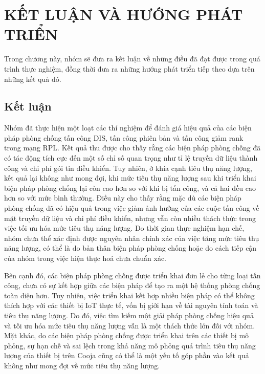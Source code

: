 \section{KẾT LUẬN VÀ HƯỚNG PHÁT TRIỂN}
\label{sec:ch6}

Trong chương này, nhóm sẽ đưa ra kết luận về những điều đã đạt được trong quá trình thực nghiệm, đồng thời đưa ra những hướng phát triển tiếp theo dựa trên những kết quả đó.

\subsection{Kết luận}
Nhóm đã thực hiện một loạt các thí nghiệm để đánh giá hiệu quả của các biện pháp phòng chống tấn công DIS, tấn công phiên bản và tấn công giảm rank trong mạng RPL. Kết quả thu được cho thấy rằng các biện pháp phòng chống đã có tác động tích cực đến một số chỉ số quan trọng như tỉ lệ truyền dữ liệu thành công và chi phí gói tin điều khiển. Tuy nhiên, ở khía cạnh tiêu thụ năng lượng, kết quả lại không như mong đợi, khi mức tiêu thụ năng lượng sau khi triển khai biện pháp phòng chống lại còn cao hơn so với khi bị tấn công, và cả hai đều cao hơn so với mức bình thường. Điều này cho thấy rằng mặc dù các biện pháp phòng chống đã có hiệu quả trong việc giảm ảnh hưởng của các cuộc tấn công về mặt truyền dữ liệu và chi phí điều khiển, nhưng vẫn còn nhiều thách thức trong việc tối ưu hóa mức tiêu thụ năng lượng. Do thời gian thực nghiệm hạn chế, nhóm chưa thể xác định được nguyên nhân chính xác của việc tăng mức tiêu thụ năng lượng, có thể là do bản thân biện pháp phòng chống hoặc do cách tiếp cận của nhóm trong việc hiện thực hoá chưa chuẩn xác.

Bên cạnh đó, các biện pháp phòng chống được triển khai đơn lẻ cho từng loại tấn công, chưa có sự kết hợp giữa các biện pháp để tạo ra một hệ thống phòng chống toàn diện hơn. Tuy nhiên, việc triển khai kết hợp nhiều biện pháp có thể không thích hợp với các thiết bị IoT thực tế, vốn bị giới hạn về tài nguyên tính toán và tiêu thụ năng lượng. Do đó, việc tìm kiếm một giải pháp phòng chống hiệu quả và tối ưu hóa mức tiêu thụ năng lượng vẫn là một thách thức lớn đối với nhóm. Mặt khác, do các biện pháp phòng chống được triển khai trên các thiết bị mô phỏng, sự hạn chế và sai lệch trong khả năng mô phỏng quá trình tiêu thụ năng lượng của thiết bị trên Cooja cũng có thể là một yếu tố góp phần vào kết quả không như mong đợi về mức tiêu thụ năng lượng.

